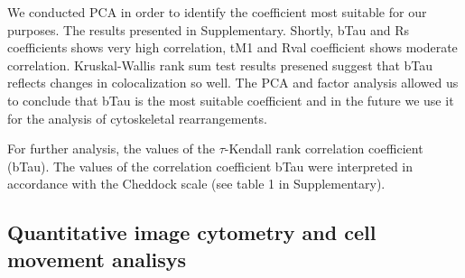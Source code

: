 \documentclass[alpha-refs]{wiley-article}
\begin{document}
We conducted PCA in order to identify the coefficient most suitable for our purposes.
The results presented in Supplementary.
Shortly, bTau and Rs coefficients shows very high correlation, tM1 and Rval coefficient shows moderate correlation.
Kruskal-Wallis rank sum test results presened suggest that bTau reflects changes in colocalization so well.
The PCA and factor analysis allowed us to conclude that bTau is the most suitable coefficient and in the future we use it for the analysis of cytoskeletal rearrangements.

For further analysis, the values of the $\tau$-Kendall rank correlation coefficient (bTau).
The values of the correlation coefficient bTau were interpreted in accordance with the Cheddock scale (see table 1 in Supplementary).


\subsection{Quantitative image cytometry and cell movement analisys}
\end{document}
